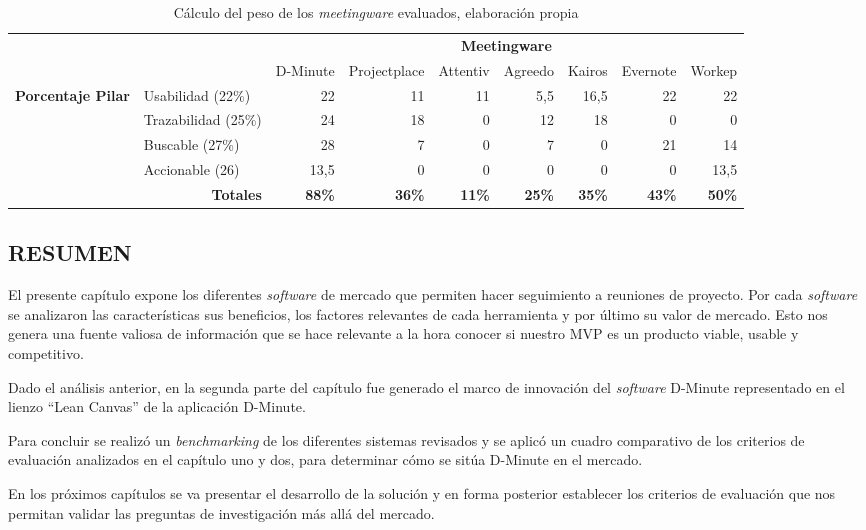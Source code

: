 \begin{table}[!h]
\centering
\caption{Cálculo del peso de los \textit{meetingware} evaluados, elaboración propia}
\label{tab:evaluacionfinal}
\resizebox{15cm}{!} {
\begin{tabular}{cl|r|r|r|r|r|r|r|}
\cline{3-9}
\multicolumn{1}{l}{} &  & \multicolumn{7}{c|}{\textbf{Meetingware}} \\ \cline{3-9} 
\multicolumn{1}{l}{} & \multicolumn{1}{c|}{} & \multicolumn{1}{c|}{D-Minute} & \multicolumn{1}{c|}{Projectplace} & \multicolumn{1}{c|}{Attentiv} & \multicolumn{1}{c|}{Agreedo} & \multicolumn{1}{c|}{Kairos} & \multicolumn{1}{c|}{Evernote} & \multicolumn{1}{c|}{Workep} \\ \hline
\multicolumn{1}{|c|}{\multirow{4}{*}{\textbf{Porcentaje Pilar}}} & Usabilidad (22\%) & 22 & 11 & 11 & 5,5 & 16,5 & 22 & 22 \\ \cline{2-9} 
\multicolumn{1}{|c|}{} & Trazabilidad (25\%) & 24 & 18 & 0 & 12 & 18 & 0 & 0 \\ \cline{2-9} 
\multicolumn{1}{|c|}{} & Buscable (27\%) & 28 & 7 & 0 & 7 & 0 & 21 & 14 \\ \cline{2-9} 
\multicolumn{1}{|c|}{} & Accionable (26) & 13,5 & 0 & 0 & 0 & 0 & 0 & 13,5 \\ \hline
\multicolumn{2}{|r|}{\textbf{Totales}} & \textbf{88\%} & \textbf{36\%} & \textbf{11\%} & \textbf{25\%} & \textbf{35\%} & \textbf{43\%} & \textbf{50\%} \\ \hline
\end{tabular}

}
\end{table}


\subsection{RESUMEN}

El presente capítulo expone los diferentes \textit{software} de mercado que permiten hacer seguimiento a reuniones de proyecto. Por cada \textit{software} se analizaron las características sus beneficios, los factores relevantes de cada herramienta y por último su valor de mercado. Esto nos genera una fuente valiosa de información que se hace relevante a la hora conocer si nuestro MVP es un producto viable, usable y competitivo. 

Dado el análisis anterior, en la segunda parte del capítulo fue generado el marco de innovación del \textit{software} D-Minute representado en el lienzo “Lean Canvas” de la aplicación D-Minute.

Para concluir se realizó un \textit{benchmarking} de los diferentes sistemas revisados y se aplicó un cuadro comparativo de los criterios de evaluación analizados en el capítulo uno y dos, para determinar cómo se sitúa D-Minute en el mercado.

En los próximos capítulos se va presentar el desarrollo de la solución y en forma posterior establecer los criterios de evaluación que nos permitan validar las preguntas de investigación más allá del mercado.

